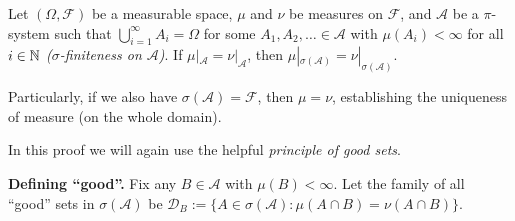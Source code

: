 \begin{enumerate}
\begin{proposition}
\label{prp:meas-unique}
Let \((\Omega,\mathcal{F})\) be a measurable space, \(\mu\) and \(\nu\) be
measures on \(\mathcal{F}\), and \(\mathcal{A}\) be a \(\pi\)-system such that
\(\bigcup_{i=1}^{\infty}A_i=\Omega\) for some \(A_1,A_2,\dotsc\in\mathcal{A}\)
with \(\mu(A_i)<\infty\) for all \(i\in\mathbb{N}\) \emph{(\(\sigma\)-finiteness on
\(\mathcal{A}\))}. If \(\mu|_{\mathcal{A}}=\nu|_{\mathcal{A}}\), then
\(\mu|_{\sigma(\mathcal{A})}=\nu|_{\sigma(\mathcal{A})}\).
\begin{note}
Particularly, if we also have \(\sigma(\mathcal{A})=\mathcal{F}\), then
\(\mu=\nu\), establishing the uniqueness of measure (on the whole domain).
\end{note}
\end{proposition}
\begin{pf}
In this proof we will again use the helpful \emph{principle of good sets}.

\textbf{Defining ``good''.} Fix any \(B\in\mathcal{A}\) with \(\mu(B)<\infty\).
Let the family of all ``good'' sets in \(\sigma(\mathcal{A})\) be
\(\mathcal{D}_{B}:=\{A\in\sigma(\mathcal{A}):\mu(A\cap B)=\nu(A\cap B)\}\).


\end{pf}
\end{enumerate}
